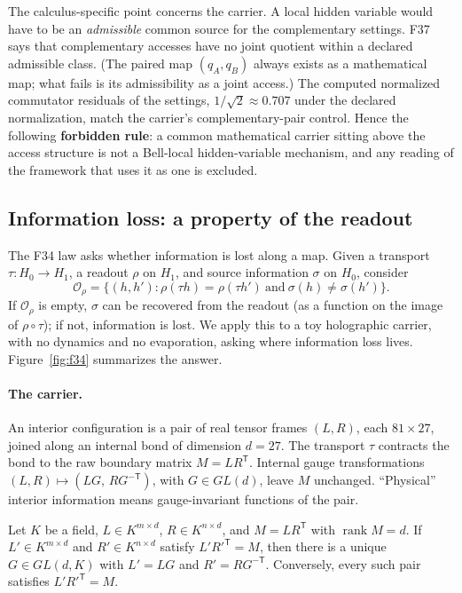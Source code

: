 The calculus-specific point concerns the carrier. A local hidden variable would have to be an \emph{admissible} common
source for the complementary settings. F37 says that complementary accesses have no joint quotient within a declared
admissible class. (The paired map \((q_A,q_B)\) always exists as a mathematical map; what fails is its admissibility
as a joint access.) The computed normalized commutator residuals of the settings, \(1/\sqrt2\approx0.707\) under the declared
normalization, match the carrier's complementary-pair control. Hence
the following \textbf{forbidden rule}: a common mathematical carrier sitting above the access structure is not a
Bell-local hidden-variable mechanism, and any reading of the framework that uses it as one is excluded.

\subsection{Information loss: a property of the readout}\label{black-hole-information-loss-is-a-property-of-the-readout-not-the-carrier}

The F34 law asks whether information is lost along a map. Given a transport \(\tau:H_0\to H_1\), a readout \(\rho\) on
\(H_1\), and source information \(\sigma\) on \(H_0\), consider
\[
\mathcal O_\rho=\{(h,h') : \rho(\tau h)=\rho(\tau h')\ \text{and}\ \sigma(h)\neq\sigma(h')\}.
\]
If \(\mathcal O_\rho\) is empty, \(\sigma\) can be recovered from the readout (as a function on the image of
\(\rho\circ\tau\)); if not, information is lost. We apply this to a toy holographic carrier, with no dynamics and no
evaporation, asking where information loss lives. Figure~\ref{fig:f34} summarizes the answer.

\paragraph{The carrier.} An interior configuration is a pair of real tensor frames \((L,R)\), each \(81\times27\),
joined along an internal bond of dimension \(d=27\). The transport \(\tau\) contracts the bond to the raw boundary
matrix \(M=LR^{\mathsf T}\). Internal gauge transformations \((L,R)\mapsto(LG,\,RG^{-\mathsf T})\), with \(G\in GL(d)\),
leave \(M\) unchanged. ``Physical'' interior information means gauge-invariant functions of the pair.

\begin{theorem}\label{thm:f34}
Let \(K\) be a field, \(L\in K^{m\times d}\), \(R\in K^{n\times d}\), and \(M=LR^{\mathsf T}\) with
\(\operatorname{rank}M=d\). If \(L'\in K^{m\times d}\) and \(R'\in K^{n\times d}\) satisfy \(L'R'^{\mathsf T}=M\), then
there is a unique \(G\in GL(d,K)\) with \(L'=LG\) and \(R'=RG^{-\mathsf T}\). Conversely, every such pair satisfies
\(L'R'^{\mathsf T}=M\).
\end{theorem}

